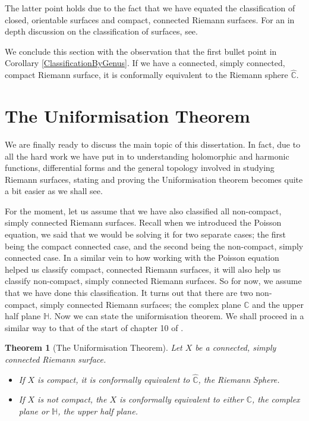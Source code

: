 \documentclass[11pt]{report}
\newtheorem{thm}{Theorem}[section]
\theoremstyle{definition}
\begin{document}
The latter point holds due to the fact that we have equated the classification of closed, orientable surfaces and compact, connected Riemann surfaces. For an in depth discussion on the classification of surfaces, see.

We conclude this section with the observation that the first bullet point in Corollary \ref{ClassificationByGenus}. If we have a connected, simply connected, compact Riemann surface, it is conformally equivalent to the Riemann sphere $\hat{\mathbb{C}}$.

\section{The Uniformisation Theorem}
We are finally ready to discuss the main topic of this dissertation. In fact, due to all the hard work we have put in to understanding holomorphic and harmonic functions, differential forms and the general topology involved in studying Riemann surfaces, stating and proving the Uniformisation theorem becomes quite a bit easier as we shall see. 

For the moment, let us assume that we have also classified all non-compact, simply connected Riemann surfaces. Recall when we introduced the Poisson equation, we said that we would be solving it for two separate cases; the first being the compact connected case, and the second being the non-compact, simply connected case. In a similar vein to how working with the Poisson equation helped us classify compact, connected Riemann surfaces, it will also help us classify non-compact, simply connected Riemann surfaces. So for now, we assume that we have done this classification. It turns out that there are two non-compact, simply connected Riemann surfaces; the complex plane $\mathbb{C}$ and the upper half plane $\mathbb{H}$.
Now we can state the uniformisation theorem. We shall proceed in a similar way to that of the start of chapter 10 of \cite{donaldson}.

\begin{thm}[The Uniformisation Theorem]\label{Uniformisation}
  Let $X$ be a connected, simply connected Riemann surface. 
  \begin{itemize}
    \item If $X$ is compact, it is conformally equivalent to $\hat{\mathbb{C}}$, the Riemann Sphere. 
    \item If $X$ is not compact, the $X$ is conformally equivalent to either $\mathbb{C}$, the complex plane or $\mathbb{H}$, the upper half plane.
  \end{itemize}
\end{thm}
\end{document}
